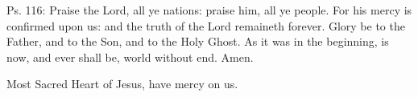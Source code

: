 \documentclass[11pt]{article}
\begin{document}

%




\begin{enpars}\noindent Ps. 116: Praise the Lord, all ye nations: praise him, all ye people. For his mercy is confirmed upon us: and the truth of the Lord remaineth forever. Glory be to the Father, and to the Son, and to the Holy Ghost. As it was in the beginning, is now, and ever shall be, world without end. Amen.\end{enpars}



\begin{enpars}\end{enpars}


\begin{enpars}Most Sacred Heart of Jesus, have mercy on us.
\end{enpars}
\end{document}

